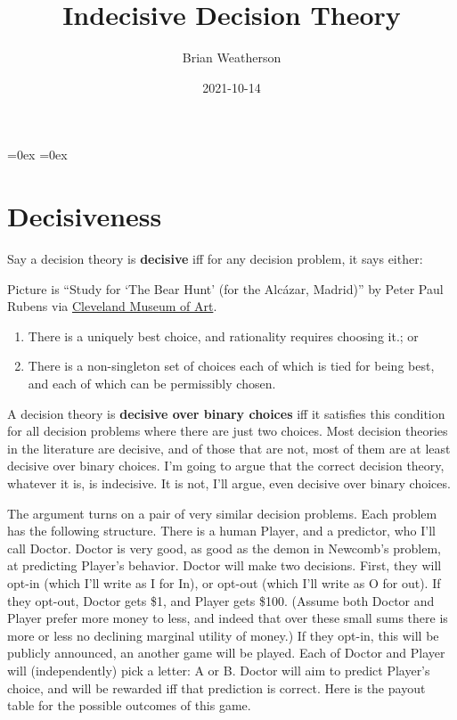 \documentclass[
  12pt,
]{article}
\title{Indecisive Decision Theory}
\author{Brian Weatherson}
\date{2021-10-14}
\providecommand{\tightlist}{%
  \setlength{\itemsep}{0pt}\setlength{\parskip}{0pt}}
\begin{document}
\maketitle

\setlength\heavyrulewidth{0ex}
\setlength\lightrulewidth{0.08ex}

\aboverulesep=0ex
\belowrulesep=0ex
\renewcommand{\arraystretch}{1.2}
\hypersetup{hidelinks}

\renewcommand\refname{References}

\captionsetup{labelformat=empty, font = small, font = bf, position = below}

\hypertarget{decisiveness}{%
\section{Decisiveness}\label{decisiveness}}

Say a decision theory is \textbf{decisive} iff for any decision problem,
it says either:

Picture is ``Study for `The Bear Hunt' (for the Alcázar, Madrid)'' by
Peter Paul Rubens via
\href{https://www.clevelandart.org/art/1983.69}{Cleveland Museum of
Art}.

\begin{enumerate}
\def\labelenumi{\arabic{enumi}.}
\tightlist
\item
  There is a uniquely best choice, and rationality requires choosing
  it.; or
\item
  There is a non-singleton set of choices each of which is tied for
  being best, and each of which can be permissibly chosen.
\end{enumerate}

A decision theory is \textbf{decisive over binary choices} iff it
satisfies this condition for all decision problems where there are just
two choices. Most decision theories in the literature are decisive, and
of those that are not, most of them are at least decisive over binary
choices. I'm going to argue that the correct decision theory, whatever
it is, is indecisive. It is not, I'll argue, even decisive over binary
choices.

The argument turns on a pair of very similar decision problems. Each
problem has the following structure. There is a human Player, and a
predictor, who I'll call Doctor. Doctor is very good, as good as the
demon in Newcomb's problem, at predicting Player's behavior. Doctor will
make two decisions. First, they will opt-in (which I'll write as I for
In), or opt-out (which I'll write as O for out). If they opt-out, Doctor
gets \$1, and Player gets \$100. (Assume both Doctor and Player prefer
more money to less, and indeed that over these small sums there is more
or less no declining marginal utility of money.) If they opt-in, this
will be publicly announced, an another game will be played. Each of
Doctor and Player will (independently) pick a letter: A or B. Doctor
will aim to predict Player's choice, and will be rewarded iff that
prediction is correct. Here is the payout table for the possible
outcomes of this game.
\end{document}
